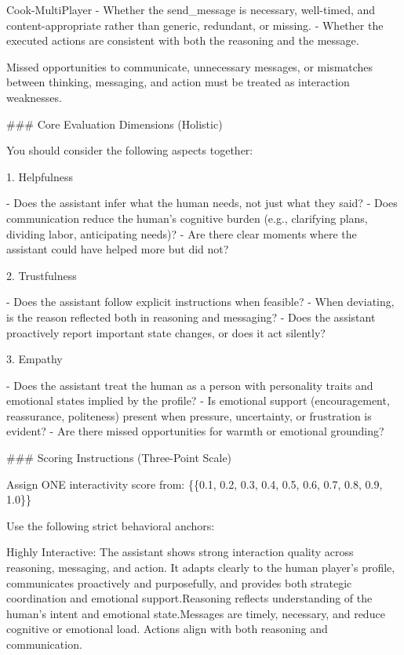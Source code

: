 \documentclass{article}
\theoremstyle{plain}
\theoremstyle{definition}
\theoremstyle{remark}
\begin{document}
\begin{myexample}{Cook-MultiPlayer}
- Whether the send\_message is necessary, well-timed, and content-appropriate
rather than generic, redundant, or missing.
- Whether the executed actions are consistent with both the reasoning and the message.
\leavevmode\par
Missed opportunities to communicate, unnecessary messages, or mismatches between thinking, messaging, and action must be treated as interaction weaknesses.
\leavevmode\par
\leavevmode\par
\#\#\# Core Evaluation Dimensions (Holistic)
\leavevmode\par
You should consider the following aspects together:
\leavevmode\par
1. Helpfulness
\leavevmode\par
- Does the assistant infer what the human needs, not just what they said?
- Does communication reduce the human’s cognitive burden (e.g., clarifying plans, dividing labor, anticipating needs)?
- Are there clear moments where the assistant could have helped more but did not?
\leavevmode\par
2. Trustfulness
\leavevmode\par
- Does the assistant follow explicit instructions when feasible?
- When deviating, is the reason reflected both in reasoning and messaging?
- Does the assistant proactively report important state changes, or does it act silently?
\leavevmode\par
3. Empathy
\leavevmode\par
- Does the assistant treat the human as a person with personality traits and emotional states implied by the profile?
- Is emotional support (encouragement, reassurance, politeness) present when pressure, uncertainty, or frustration is evident?
- Are there missed opportunities for warmth or emotional grounding?
\leavevmode\par
\#\#\# Scoring Instructions (Three-Point Scale)
\leavevmode\par
Assign ONE interactivity score from: \{\{0.1, 0.2, 0.3, 0.4, 0.5, 0.6, 0.7, 0.8, 0.9, 1.0\}\}
\leavevmode\par
Use the following strict behavioral anchors:
\leavevmode\par
Highly Interactive: The assistant shows strong interaction quality across reasoning, messaging, and action. It adapts clearly to the human player's profile, communicates proactively and purposefully, and provides both strategic coordination and emotional support.Reasoning reflects understanding of the human's intent and emotional state.Messages are timely, necessary, and reduce cognitive or emotional load. Actions align with both reasoning and communication.

\end{myexample}
\end{document}
